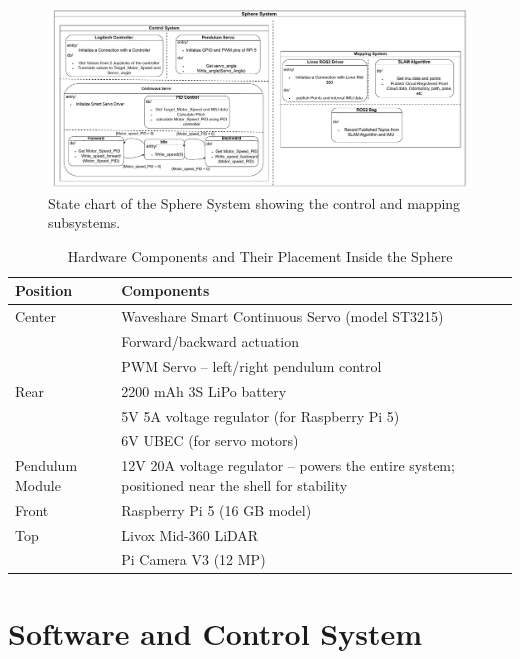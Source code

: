 \documentclass[conference]{IEEEtran}
\begin{document}
\begin{figure}[!t]
    \centering
    \includegraphics[width=1\linewidth]{pics/Khonsu.pdf} 
    \caption{State chart of the Sphere System showing the control and mapping subsystems.}
    \label{fig:sphere_system}
\end{figure}


\begin{table}[H]
\centering
\caption{Hardware Components and Their Placement Inside the Sphere}
\label{tab:hardware_components}
\begin{tabularx}{\linewidth}{@{}l X@{}}
\toprule
\textbf{Position} & \textbf{Components} \\
\midrule
Center & Waveshare Smart Continuous Servo (model ST3215) \\
       & Forward/backward actuation \\
       & PWM Servo – left/right pendulum control \\
Rear   & 2200 mAh 3S LiPo battery \\
       & 5V 5A voltage regulator (for Raspberry Pi 5) \\
       & 6V UBEC (for servo motors) \\
Pendulum Module & 12V 20A voltage regulator – powers the entire system; positioned near the shell for stability \\
Front  & Raspberry Pi 5 (16 GB model) \\
Top    & Livox Mid-360 LiDAR \\
       & Pi Camera V3 (12 MP) \\
\bottomrule
\end{tabularx}
\end{table}







\section{Software and Control System}
\end{document}
